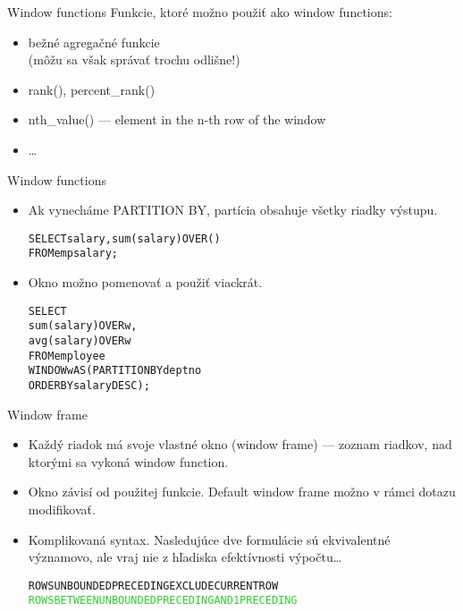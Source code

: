 \documentclass[12pt]{beamer}
\def\blue#1{\textcolor{Cerulean}{#1}}
\def\green#1{\textcolor{LimeGreen}{#1}}
\begin{document}
\begin{frame}[fragile]{Window functions}
Funkcie, ktoré možno použiť ako window functions:
\begin{itemize}
\item bežné agregačné funkcie\\
    (môžu sa však správať trochu odlišne!)
\item rank(), percent\_rank()
\item nth\_value() --- element in the n-th row of the window
\item \dots
\end{itemize}
\end{frame}

\begin{frame}[fragile]{Window functions}
\begin{itemize}
\item Ak vynecháme PARTITION BY, partícia obsahuje všetky riadky výstupu.
\begin{alltt}
    SELECT salary, sum(salary) \alert{OVER ()}
    FROM empsalary;
\end{alltt}
\vspace*{4mm}
\pause
\item Okno možno pomenovať a použiť viackrát.
\begin{alltt}
    SELECT
        sum(salary) OVER \blue{w},
        avg(salary) OVER \blue{w}
    FROM employee
    \alert{WINDOW \blue{w} AS (PARTITION BY deptno
                ORDER BY salary DESC);
}
\end{alltt}
\end{itemize}
\end{frame}

\begin{frame}[fragile]{Window frame}
\begin{itemize}
\item Každý riadok má svoje vlastné okno (window frame) --- zoznam riadkov, nad ktorými sa vykoná window function.
\item Okno závisí od použitej funkcie. Default window frame možno v rámci dotazu modifikovať.
\item Komplikovaná syntax. Nasledujúce dve formulácie sú ekvivalentné významovo, ale vraj nie z hľadiska efektívnosti výpočtu\dots
\begin{alltt}
\blue{ROWS UNBOUNDED PRECEDING EXCLUDE CURRENT ROW}
\green{ROWS BETWEEN UNBOUNDED PRECEDING AND 1 PRECEDING}
\end{alltt}
\end{itemize}
\end{frame}
\end{document}
